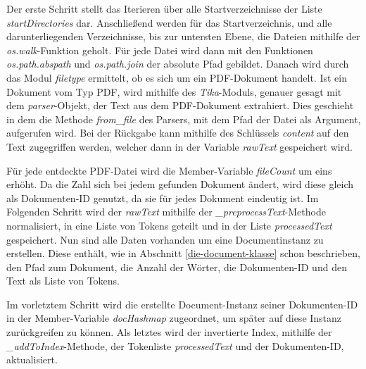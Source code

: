 Der erste Schritt stellt das Iterieren über alle Startverzeichnisse der Liste \textit{startDirectories} dar. Anschließend werden für das Startverzeichnis, und alle darunterliegenden Verzeichnisse, bis zur untersten Ebene, die Dateien mithilfe der \textit{os.walk}-Funktion geholt. Für jede Datei wird dann mit den Funktionen \textit{os.path.abspath} und \textit{os.path.join} der absolute Pfad gebildet. Danach wird durch das Modul \textit{filetype} ermittelt, ob es sich um ein PDF-Dokument handelt. Ist ein Dokument vom Typ PDF, wird mithilfe des \textit{Tika}-Moduls, genauer gesagt mit dem \textit{parser}-Objekt, der Text aus dem PDF-Dokument extrahiert. Dies geschieht in dem die Methode \textit{from\_file} des Parsers, mit dem Pfad der Datei als Argument, aufgerufen wird. Bei der Rückgabe kann mithilfe des Schlüssels \textit{content} auf den Text zugegriffen werden, welcher dann in der Variable \textit{rawText} gespeichert wird.

Für jede entdeckte PDF-Datei wird die Member-Variable \textit{fileCount} um eins erhöht. Da die Zahl sich bei jedem gefunden Dokument ändert, wird diese gleich als Dokumenten-ID genutzt, da sie für jedes Dokument eindeutig ist. Im Folgenden Schritt wird der \textit{rawText} mithilfe der \textit{\_preprocessText}-Methode normalisiert, in eine Liste von Tokens geteilt und in der Liste \textit{processedText} gespeichert. Nun sind alle Daten vorhanden um eine Documentinstanz zu erstellen. Diese enthält, wie in Abschnitt \ref{die-document-klasse} schon beschrieben, den Pfad zum Dokument, die Anzahl der Wörter, die Dokumenten-ID und den Text als Liste von Tokens.

Im vorletztem Schritt wird die erstellte Document-Instanz seiner Dokumenten-ID in der Member-Variable \textit{docHashmap} zugeordnet, um später auf diese Instanz zurückgreifen zu können. Als letztes wird der invertierte Index, mithilfe der \textit{\_addToIndex}-Methode, der Tokenliste \textit{processedText} und der Dokumenten-ID, aktualisiert.

